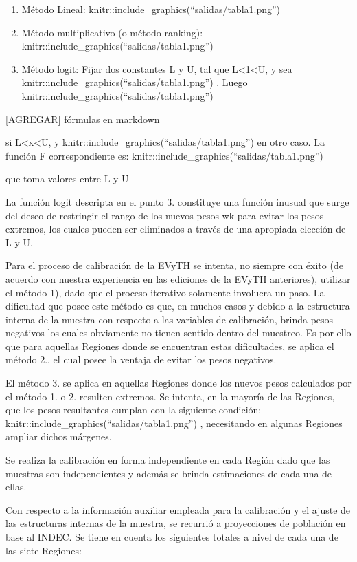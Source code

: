 \documentclass[
  openany]{book}
\begin{document}
\begin{enumerate}
\def\labelenumi{\arabic{enumi}.}
\item
  Método Lineal: knitr::include\_graphics(``salidas/tabla1.png'')
\item
  Método multiplicativo (o método ranking): knitr::include\_graphics(``salidas/tabla1.png'')
\item
  Método logit: Fijar dos constantes L y U, tal que L\textless1\textless U, y sea knitr::include\_graphics(``salidas/tabla1.png'') . Luego knitr::include\_graphics(``salidas/tabla1.png'')
\end{enumerate}

{[}AGREGAR{]} fórmulas en markdown

si L\textless x\textless U, y knitr::include\_graphics(``salidas/tabla1.png'') en otro caso. La función F correspondiente es:
knitr::include\_graphics(``salidas/tabla1.png'')

que toma valores entre L y U

La función logit descripta en el punto 3. constituye una función inusual que surge del deseo de restringir el rango de los nuevos pesos wk para evitar los pesos extremos, los cuales pueden ser eliminados a través de una apropiada elección de L y U.

Para el proceso de calibración de la EVyTH se intenta, no siempre con éxito (de acuerdo con nuestra experiencia en las ediciones de la EVyTH anteriores), utilizar el método 1), dado que el proceso iterativo solamente involucra un paso. La dificultad que posee este método es que, en muchos casos y debido a la estructura interna de la muestra con respecto a las variables de calibración, brinda pesos negativos los cuales obviamente no tienen sentido dentro del muestreo. Es por ello que para aquellas Regiones donde se encuentran estas dificultades, se aplica el método 2., el cual posee la ventaja de evitar los pesos negativos.

El método 3. se aplica en aquellas Regiones donde los nuevos pesos calculados por el método 1. o 2. resulten extremos. Se intenta, en la mayoría de las Regiones, que los pesos resultantes cumplan con la siguiente condición: knitr::include\_graphics(``salidas/tabla1.png'') , necesitando en algunas Regiones ampliar dichos márgenes.

Se realiza la calibración en forma independiente en cada Región dado que las muestras son independientes y además se brinda estimaciones de cada una de ellas.

Con respecto a la información auxiliar empleada para la calibración y el ajuste de las estructuras internas de la muestra, se recurrió a proyecciones de población en base al INDEC. Se tiene en cuenta los siguientes totales a nivel de cada una de las siete Regiones:
\end{document}
